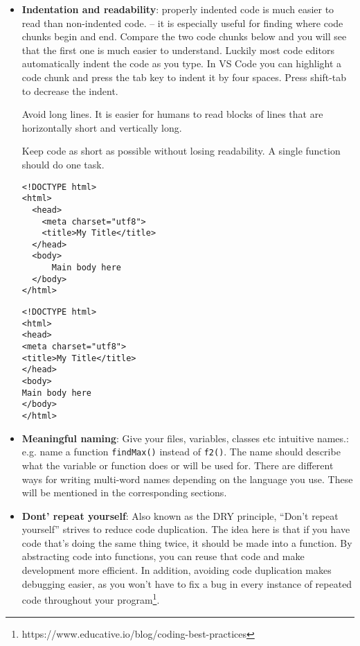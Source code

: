 \documentclass[english,11pt,a4paper]{report}
\newcommand{\bfb}[1]{{\bf \color{blue} #1}}
\begin{document}
\begin{itemize}
\item \bfb{Indentation and readability}: properly indented code is much easier to read than non-indented code. -- it is especially useful for finding where code chunks begin and end. Compare the two code chunks below and you will see that the first one is much easier to understand. Luckily most code editors automatically indent the code as you type.  In VS Code you can highlight a code chunk and press the tab key to indent it by four spaces. Press shift-tab to decrease the indent.

Avoid long lines. It is easier for humans to read blocks of lines that are horizontally short and vertically long. 

Keep code as short as possible without losing readability. A single function should do one task.

\newpage
\begin{multicols}{2}
\begin{lstlisting}[style=htmlcssjs]
<!DOCTYPE html>
<html>
  <head>
    <meta charset="utf8">
    <title>My Title</title>
  </head>
  <body>
      Main body here
  </body>
</html>
\end{lstlisting}

\begin{lstlisting}[style=htmlcssjs]
<!DOCTYPE html>
<html>
<head>
<meta charset="utf8">
<title>My Title</title>
</head>
<body>
Main body here
</body>
</html>
\end{lstlisting}
\end{multicols}

\item \bfb{Meaningful naming}: Give your files, variables, classes etc intuitive names.: e.g.  name a function \verb|findMax()| instead of \verb|f2()|. The name should describe what the variable or function does or will be used for. There are different ways for writing multi-word names depending on the language you use. These will be mentioned in the corresponding sections.

\item \bfb{Dont' repeat yourself}: Also known as the DRY principle, “Don’t repeat yourself” strives to reduce code duplication. The idea here is that if you have code that’s doing the same thing twice, it should be made into a function. By abstracting code into functions, you can reuse that code and make development more efficient. In addition, avoiding code duplication makes debugging easier, as you won’t have to fix a bug in every instance of repeated code throughout your program\footnote{https://www.educative.io/blog/coding-best-practices}.


\end{itemize}
\end{document}
